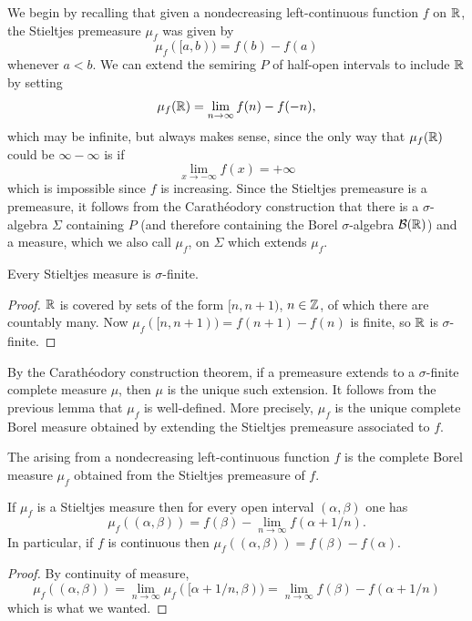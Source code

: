 \begin{subsec}
We begin by recalling that given a nondecreasing left-continuous function $f$ on $\mathbb{R}$, the Stieltjes premeasure $\mu_{f}$ was given by
\[\mu_{f}([a, b)) = f(b) - f(a)\]
whenever $a < b$.
We can extend the semiring $P$ of half-open intervals to include $\mathbb{R}$ by setting
\[\mu_{f}(\mathbb{R}) = \lim_{n \to \infty} f(n) - f(-n),\]
which may be infinite, but always makes sense, since the only way that $\mu_{f}(\mathbb{R})$ could be $\infty - \infty$ is if
\[\lim_{x \to -\infty} f(x) = +\infty\]
which is impossible since $f$ is increasing.
Since the Stieltjes premeasure is a premeasure, it follows from the Carathéodory construction that there is a $\sigma$-algebra $\Sigma$ containing $P$ (and therefore containing the Borel $\sigma$-algebra $\mathcal B(\mathbb{R})$) and a measure, which we also call $\mu_{f}$, on $\Sigma$ which extends $\mu_{f}$.
\end{subsec}

\begin{lemma}
Every Stieltjes measure is $\sigma$-finite.
\end{lemma}
\begin{proof}
$\mathbb{R}$ is covered by sets of the form $[n, n + 1)$, $n \in \mathbb{Z}$, of which there are countably many.
Now $\mu_{f}([n, n + 1)) = f(n+1) - f(n)$ is finite, so $\mathbb{R}$ is $\sigma$-finite.
\end{proof}

\begin{subsec}
By the Carathéodory construction theorem, if a premeasure extends to a $\sigma$-finite complete measure $\mu$, then $\mu$ is the unique such extension.
It follows from the previous lemma that $\mu_{f}$ is well-defined.
More precisely, $\mu_{f}$ is the unique complete Borel measure obtained by extending the Stieltjes premeasure associated to $f$.
\end{subsec}

\begin{definition}
The  arising from a nondecreasing left-continuous function $f$ is the complete Borel measure $\mu_{f}$ obtained from the Stieltjes premeasure of $f$.
\end{definition}

\begin{lemma}
If $\mu_{f}$ is a Stieltjes measure then for every open interval $(\alpha, \beta)$ one has
\[\mu_{f}((\alpha, \beta)) = f(\beta) - \lim_{n \to \infty} f(\alpha + 1/n).\]
In particular, if $f$ is continuous then $\mu_{f}((\alpha, \beta)) = f(\beta) - f(\alpha)$.
\end{lemma}
\begin{proof}
By continuity of measure,
\[\mu_{f}((\alpha, \beta)) = \lim_{n \to \infty} \mu_{f}([\alpha + 1/n, \beta)) = \lim_{n \to \infty} f(\beta) - f(\alpha + 1/n)\]
which is what we wanted.
\end{proof}

